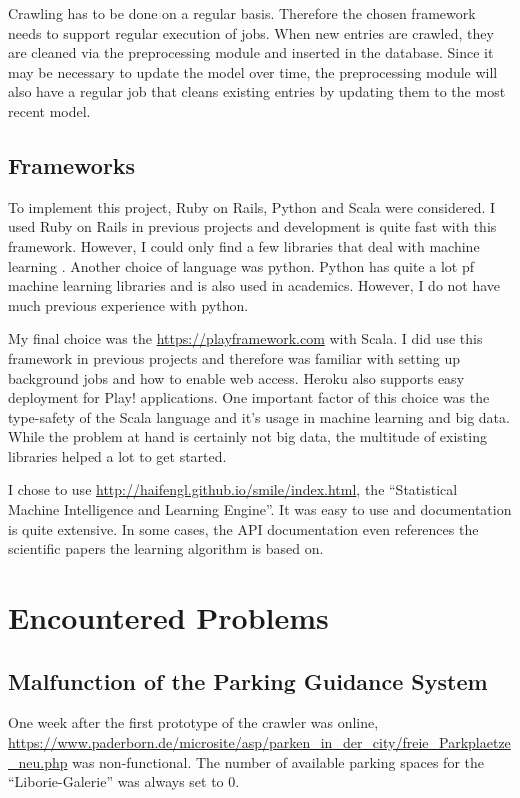 Crawling has to be done on a regular basis. Therefore the chosen framework needs to support regular execution of jobs. When new entries are crawled, they are cleaned via the preprocessing module and inserted in the database. Since it may be necessary to update the model over time, the preprocessing module will also have a regular job that cleans existing entries by updating them to the most recent model.



\subsection{Frameworks}\label{sec:frameworks}
To implement this project, Ruby on Rails, Python and Scala were considered. I used Ruby on Rails in previous projects and development is quite fast with this framework. However, I could only find a few libraries that deal with machine learning \cite{bigml} \cite{leanpanda}. 
Another choice of language was python. Python has quite a lot pf machine learning libraries and is also used in academics. However, I do not have much previous experience with python.

My final choice was the \href{Play! framework}{https://playframework.com} with Scala. I did use this framework in previous projects and therefore was familiar with setting up background jobs and how to enable web access. Heroku also supports easy deployment for Play! applications. One important factor of this choice was the type-safety of the Scala language and it's usage in machine learning and big data. While the problem at hand is certainly not big data, the multitude of existing libraries helped a lot to get started.

I chose to use \href{Smile}{http://haifengl.github.io/smile/index.html}, the ``Statistical Machine Intelligence and Learning Engine''. It was easy to use and documentation is quite extensive. In some cases, the API documentation even references the scientific papers the learning algorithm is based on. 


\section{Encountered Problems}
\subsection{Malfunction of the Parking Guidance System}
One week after the first prototype of the crawler was online, \url{https://www.paderborn.de/microsite/asp/parken_in_der_city/freie_Parkplaetze_neu.php} was non-functional. The number of available parking spaces for the ``Liborie-Galerie'' was always set to \(0\).

